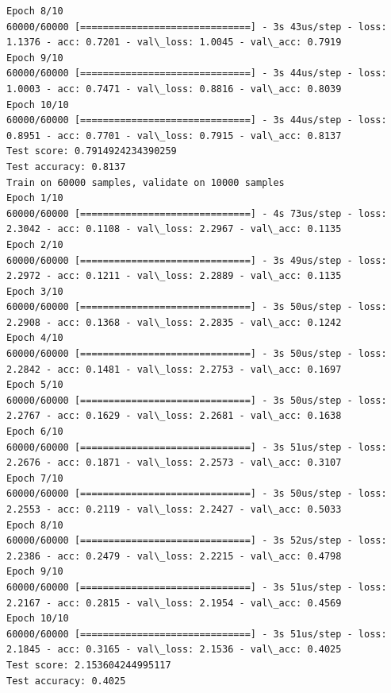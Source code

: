 \documentclass[11pt]{article}
\begin{document}
\begin{Verbatim}[commandchars=\\\{\}]
Epoch 8/10
60000/60000 [==============================] - 3s 43us/step - loss: 1.1376 - acc: 0.7201 - val\_loss: 1.0045 - val\_acc: 0.7919
Epoch 9/10
60000/60000 [==============================] - 3s 44us/step - loss: 1.0003 - acc: 0.7471 - val\_loss: 0.8816 - val\_acc: 0.8039
Epoch 10/10
60000/60000 [==============================] - 3s 44us/step - loss: 0.8951 - acc: 0.7701 - val\_loss: 0.7915 - val\_acc: 0.8137
Test score: 0.7914924234390259
Test accuracy: 0.8137
Train on 60000 samples, validate on 10000 samples
Epoch 1/10
60000/60000 [==============================] - 4s 73us/step - loss: 2.3042 - acc: 0.1108 - val\_loss: 2.2967 - val\_acc: 0.1135
Epoch 2/10
60000/60000 [==============================] - 3s 49us/step - loss: 2.2972 - acc: 0.1211 - val\_loss: 2.2889 - val\_acc: 0.1135
Epoch 3/10
60000/60000 [==============================] - 3s 50us/step - loss: 2.2908 - acc: 0.1368 - val\_loss: 2.2835 - val\_acc: 0.1242
Epoch 4/10
60000/60000 [==============================] - 3s 50us/step - loss: 2.2842 - acc: 0.1481 - val\_loss: 2.2753 - val\_acc: 0.1697
Epoch 5/10
60000/60000 [==============================] - 3s 50us/step - loss: 2.2767 - acc: 0.1629 - val\_loss: 2.2681 - val\_acc: 0.1638
Epoch 6/10
60000/60000 [==============================] - 3s 51us/step - loss: 2.2676 - acc: 0.1871 - val\_loss: 2.2573 - val\_acc: 0.3107
Epoch 7/10
60000/60000 [==============================] - 3s 50us/step - loss: 2.2553 - acc: 0.2119 - val\_loss: 2.2427 - val\_acc: 0.5033
Epoch 8/10
60000/60000 [==============================] - 3s 52us/step - loss: 2.2386 - acc: 0.2479 - val\_loss: 2.2215 - val\_acc: 0.4798
Epoch 9/10
60000/60000 [==============================] - 3s 51us/step - loss: 2.2167 - acc: 0.2815 - val\_loss: 2.1954 - val\_acc: 0.4569
Epoch 10/10
60000/60000 [==============================] - 3s 51us/step - loss: 2.1845 - acc: 0.3165 - val\_loss: 2.1536 - val\_acc: 0.4025
Test score: 2.153604244995117
Test accuracy: 0.4025

    \end{Verbatim}
\end{document}
